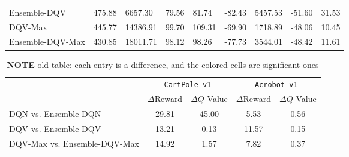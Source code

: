 \begin{table*}
\begin{tabular}{l|cl|cl|cl|cl}
Ensemble-DQV                                 & \multicolumn{1}{l}{{\cellcolor[rgb]{1,0.988,0.62}}475.88} & 6657.30                  & \multicolumn{1}{l}{79.56}                                 & 81.74                    & \multicolumn{1}{l}{-82.43} & 5457.53                  & \multicolumn{1}{l}{-51.60} & 31.53                    \\
DQV-Max                                      & 445.77                                                    & 14386.91                 & 99.70                                                     & 109.31                   & -69.90                     & 1718.89                  & -48.06                     & 10.45                    \\
Ensemble-DQV-Max                             & \multicolumn{1}{l}{430.85}                                & 18011.71                 & \multicolumn{1}{l}{98.12}                                 & 98.26                    & \multicolumn{1}{l}{-77.73} & 3544.01                  & \multicolumn{1}{l}{-48.42} & 11.61                    \\
\bottomrule
\end{tabular}
\end{table*}


\begin{table}[h!]
\centering
\setlength{\extrarowheight}{0pt}
\addtolength{\extrarowheight}{\aboverulesep}
\addtolength{\extrarowheight}{\belowrulesep}
\setlength{\aboverulesep}{0pt}
\setlength{\belowrulesep}{0pt}
\caption{\textbf{NOTE} old table: each entry is a difference, and the
  colored cells are significant ones}\label{table:results_diff_old}
\begin{tabular}{lcccc}
\toprule
\multicolumn{1}{c}{\multirow{2}{*}{}} & \multicolumn{2}{c}{\texttt{CartPole-v1}}                                    & \multicolumn{2}{c}{\texttt{Acrobot-v1}}                                    \\
\cmidrule(l){2-5}
\multicolumn{1}{c}{}                  & \multicolumn{1}{l}{$\Delta$Reward}   & \multicolumn{1}{l}{$\Delta Q$-Value} & \multicolumn{1}{l}{$\Delta$Reward} & \multicolumn{1}{l}{$\Delta Q$-Value}  \\
\midrule
DQN vs. Ensemble-DQN                  & {\cellcolor[rgb]{1,0.988,0.62}}29.81 & {\cellcolor[rgb]{1,0.988,0.62}}45.00 & 5.53                               & 0.56                                  \\
\midrule
DQV vs. Ensemble-DQV                  & {\cellcolor[rgb]{1,0.988,0.62}}13.21 & 0.13                                 & 11.57                              & 0.15                                  \\
\midrule
DQV-Max vs. Ensemble-DQV-Max          & 14.92                                & 1.57                                 & 7.82                               & 0.37                                  \\
\bottomrule
\end{tabular}
\end{table}
